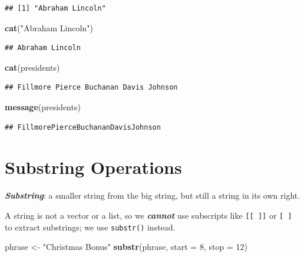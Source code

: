 \documentclass[
]{book}
\newenvironment{Shaded}{\begin{snugshade}}{\end{snugshade}}
\newcommand{\DataTypeTok}[1]{\textcolor[rgb]{0.13,0.29,0.53}{#1}}
\newcommand{\DecValTok}[1]{\textcolor[rgb]{0.00,0.00,0.81}{#1}}
\newcommand{\KeywordTok}[1]{\textcolor[rgb]{0.13,0.29,0.53}{\textbf{#1}}}
\newcommand{\NormalTok}[1]{#1}
\newcommand{\StringTok}[1]{\textcolor[rgb]{0.31,0.60,0.02}{#1}}
\begin{document}
\begin{verbatim}
## [1] "Abraham Lincoln"
\end{verbatim}

\begin{Shaded}
\begin{Highlighting}[]
\KeywordTok{cat}\NormalTok{(}\StringTok{"Abraham Lincoln"}\NormalTok{)}
\end{Highlighting}
\end{Shaded}

\begin{verbatim}
## Abraham Lincoln
\end{verbatim}

\begin{Shaded}
\begin{Highlighting}[]
\KeywordTok{cat}\NormalTok{(presidents)}
\end{Highlighting}
\end{Shaded}

\begin{verbatim}
## Fillmore Pierce Buchanan Davis Johnson
\end{verbatim}

\begin{Shaded}
\begin{Highlighting}[]
\KeywordTok{message}\NormalTok{(presidents)}
\end{Highlighting}
\end{Shaded}

\begin{verbatim}
## FillmorePierceBuchananDavisJohnson
\end{verbatim}

\hypertarget{substring-operations}{%
\section{Substring Operations}\label{substring-operations}}

\textbf{\emph{Substring}}: a smaller string from the big string, but still a string in its own right.

A string is not a vector or a list, so we \textbf{\emph{cannot}} use subscripts like \texttt{{[}{[}\ {]}{]}} or \texttt{{[}\ {]}} to extract substrings; we use \texttt{substr()} instead.

\begin{Shaded}
\begin{Highlighting}[]
\NormalTok{phrase <-}\StringTok{ "Christmas Bonus"}
\KeywordTok{substr}\NormalTok{(phrase, }\DataTypeTok{start =} \DecValTok{8}\NormalTok{, }\DataTypeTok{stop =} \DecValTok{12}\NormalTok{)}
\end{Highlighting}
\end{Shaded}
\end{document}

